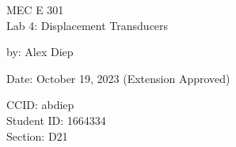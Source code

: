 \documentclass[letterpaper,12pt]{article} %
\renewcommand{\thesection}{Question \arabic{section}} %
\begin{document}
\begin{titlepage}
    \centering
    \vspace*{2cm} %
    
    \Huge {MEC E 301 \\Lab 4: Displacement Transducers} \\
    \vspace{1cm} %
    
    \Large by: Alex Diep \\
    \vspace{1cm} %

    \Large Date: October 19, 2023 (Extension Approved) \\ %
    \vspace{4cm} %

    \normalsize CCID: abdiep \\
    \normalsize Student ID: 1664334 \\ 
    \normalsize Section: D21 \\
    
    \vfill %
    
    
\end{titlepage}
\renewcommand\arraystretch{1.5}














\newpage
\appendix
\renewcommand\thefigure{\thesection.\arabic{figure}}    
\renewcommand\thetable{\thesection.\arabic{table}}
\end{document}
